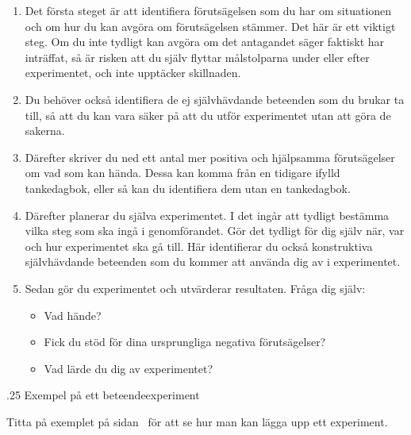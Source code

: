\documentclass[swedish,a4paper]{book}
\makeatletter
\renewcommand\subsection{\@startsection{subsection}{1}{\z@}%
                                   {\baselineskip}%
                                   {.25\baselineskip}%
                                   {\fontsize{1\baselineskip}{1.25\baselineskip}\selectfont\sffamily\bfseries}} %
\makeatother
\begin{document}
\begin{enumerate}

\item 
Det första steget är att identifiera förutsägelsen som du har om situationen och om hur du kan avgöra om förutsägelsen stämmer. Det här är ett viktigt steg. Om du inte tydligt kan avgöra om det antagandet säger faktiskt har inträffat, så är risken att du själv flyttar målstolparna under eller efter experimentet, och inte upptäcker skillnaden.

\item 
Du behöver också identifiera de ej självhävdande beteenden som du brukar ta till, så att du kan vara säker på att du utför experimentet utan att göra de sakerna.

\item 
Därefter skriver du ned ett antal mer positiva och hjälpsamma förutsägelser om vad som kan hända. Dessa kan komma från en tidigare ifylld tankedagbok, eller så kan du identifiera dem utan en tankedagbok.

\item 
Därefter planerar du själva experimentet. I det ingår att tydligt bestämma vilka steg som ska ingå i genomförandet. Gör det tydligt för dig själv när, var och hur experimentet ska gå till. Här identifierar du också konstruktiva självhävdande beteenden som du kommer att använda dig av i experimentet.

\item 
Sedan gör du experimentet och utvärderar resultaten. Fråga dig själv:

\begin{itemize}

\item Vad hände?

\item Fick du stöd för dina ursprungliga negativa förutsägelser?

\item Vad lärde du dig av experimentet?

\end{itemize}

\end{enumerate}

\subsection{Exempel på ett beteendeexperiment}

Titta på exemplet på sidan~\pageref{form:beteendeexperiment-1} för att se hur man kan lägga upp ett experiment. 
\end{document}
